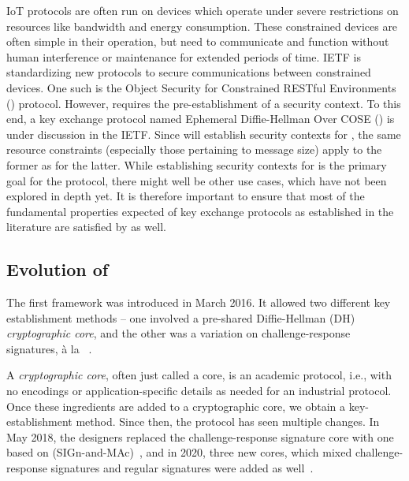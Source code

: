 IoT protocols are often run on devices which operate under severe restrictions 
on resources like bandwidth and energy consumption.
%
These constrained devices are often simple in their operation, but need to 
communicate and function without human interference or maintenance for 
extended periods of time.
%
IETF is standardizing new protocols to secure communications between 
constrained devices.
%
One such is the Object Security for Constrained RESTful Environments 
(\mOscore{}) protocol. 
%
However, \mOscore{} requires the pre-establishment of a security context.
%
To this end, a key exchange protocol named Ephemeral Diffie-Hellman Over 
COSE
(\mEdhoc{}) is under discussion in the IETF. 
%
Since \mEdhoc{} will establish security contexts for \mOscore{}, the same 
resource constraints (especially those pertaining to message size) apply to the 
former as for the latter.
%
While establishing security contexts for \mOscore{} is the primary goal for the 
\mEdhoc{} protocol, there might well be other use cases, which have not been 
explored in depth yet.
%
It is therefore important to ensure that most of the fundamental properties 
expected of key exchange protocols as established in the literature are satisfied 
by \mEdhoc{} as well.
%

\subsection{Evolution of \mEdhoc}
\label{sec:edhocevol}
The first \mEdhoc{} framework was introduced in March 2016. 
%
It allowed two different key establishment methods -- one involved a 
pre-shared 
Diffie-Hellman (DH) \emph{cryptographic core}, and the other was a 
variation on challenge-response signatures, {\`a} la 
\mOptls{}~\cite{DBLP:conf/eurosp/KrawczykW16}. 

%
A \emph{cryptographic core}, often just called a core, is an academic protocol,
i.e., with no encodings or application-specific details as needed for an 
industrial protocol. 
%
Once these ingredients are added to a cryptographic core, we obtain a 
key-establishment 
method.
%
Since then, the protocol has seen multiple changes.
%
In May 2018, the designers replaced the challenge-response signature core with
one based on \mSigma{}
(SIGn-and-MAc)~\cite{sigma,bruni-analysis-selander-ace-cose-ecdhe-08}, and 
in
2020, three new cores, which mixed challenge-response signatures and regular 
signatures were added as well~\cite{our-analysis-selander-lake-edhoc-00}.

